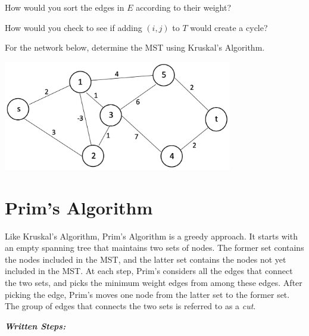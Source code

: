 \documentclass[12pt]{article}
\theoremstyle{definition}
\begin{document}
\vfill

How would you sort the edges in $E$ according to their weight? 

\vfill

How would you check to see if adding $(i,j)$ to $T$ would create a cycle?
\vfill

\newpage

For the network below, determine the MST using Kruskal's Algorithm.

\begin{center}
\includegraphics[width=10cm]{minspanningtree}
\end{center}


\newpage
\section{Prim's Algorithm}

Like Kruskal's Algorithm, Prim's Algorithm is a greedy approach. It starts with an empty spanning tree that maintains two sets of nodes. The former set contains the nodes included in the MST, and the latter set contains the nodes not yet included in the MST. At each step, Prim's considers all the edges that connect the two sets, and picks the minimum weight edges from among these edges. After picking the edge, Prim's moves one node from the latter set to the former set. The group of edges that connects the two sets is referred to as a \emph{cut}. 

\emph{\textbf{Written Steps:}}
\end{document}
